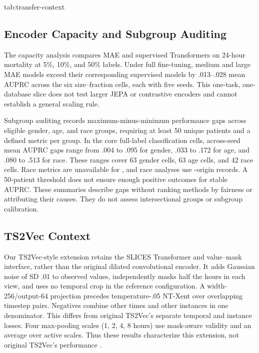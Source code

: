 \begin{table}[htbp]
\floatconts
  {tab:transfer-context}
  {\caption{Fine-tuned \MAE{} on each target database, by pretraining source, beside the supervised Transformer trained from scratch on the target. Means over five seeds. Classification uses AUPRC. LOS uses absolute error in days. Bold marks the best mean in each row.}}
  {\scriptsize
  }
\end{table}

\subsection{Encoder Capacity and Subgroup Auditing}
\label{app:capacity-subgroups}

The capacity analysis compares MAE and supervised Transformers on \MIMIC{} 24-hour mortality at 5\%, 10\%, and 50\% labels. Under full fine-tuning, medium and large MAE models exceed their corresponding supervised models by .013--.028 mean AUPRC across the six size--fraction cells, each with five seeds. This one-task, one-database slice does not test larger JEPA or contrastive encoders and cannot establish a general scaling rule.

Subgroup auditing records maximum-minus-minimum performance gaps across eligible gender, age, and race groups, requiring at least 50 unique patients and a defined metric per group. In the core full-label classification cells, across-seed mean AUPRC gaps range from .004 to .095 for gender, .033 to .172 for age, and .080 to .513 for race. These ranges cover 63 gender cells, 63 age cells, and 42 race cells. Race metrics are unavailable for \EICU{}, and \Combined{} race analyses use \MIMIC{}-origin records. A 50-patient threshold does not ensure enough positive outcomes for stable AUPRC. These summaries describe gaps without ranking methods by fairness or attributing their causes. They do not assess intersectional groups or subgroup calibration.

\subsection{TS2Vec Context}

\label{app:ts2vec}

Our TS2Vec-style extension retains the SLICES Transformer and value--mask interface, rather than the original dilated convolutional encoder. It adds Gaussian noise of SD .01 to observed values, independently masks half the hours in each view, and uses no temporal crop in the reference configuration. A width-256/output-64 projection precedes temperature-.05 NT-Xent over overlapping timestep pairs. Negatives combine other times and other instances in one denominator. This differs from original TS2Vec's separate temporal and instance losses. Four max-pooling scales (1, 2, 4, 8 hours) use mask-aware validity and an average over active scales. Thus these results characterize this extension, not original TS2Vec's performance \citep{yue2022ts2vec}.

